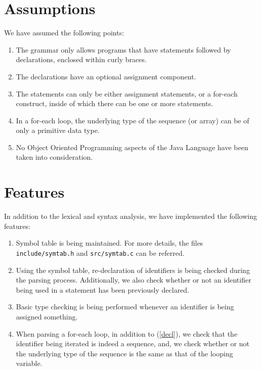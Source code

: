 \documentclass{article}
\begin{document}
\section{Assumptions}

We have assumed the following points:

\begin{enumerate}
    \item The grammar only allows programs that have statements followed by declarations, enclosed within curly braces.
    \item The declarations have an optional assignment component.
    \item The statements can only be either assignment statements, or a for-each construct, inside of which there can be one or more statements.
    \item In a for-each loop, the underlying type of the sequence (or array) can be of only a primitive data type.
    \item No Object Oriented Programming aspects of the Java Language have been taken into consideration.
\end{enumerate}

\section{Features}

In addition to the lexical and syntax analysis, we have implemented the following features:

\begin{enumerate}
    \item Symbol table is being maintained. For more details, the files \\ \texttt{include/symtab.h} and \texttt{src/symtab.c} can be referred.
    \item \label{decl} Using the symbol table, re-declaration of identifiers is being checked during the parsing process. Additionally, we also check whether or not an identifier being used in a statement has been previously declared.
    \item Basic type checking is being performed whenever an identifier is being assigned something.
    \item When parsing a for-each loop, in addition to (\ref{decl}), we check that the identifier being iterated is indeed a sequence, and, we check whether or not the underlying type of the sequence is the same as that of the looping variable.
\end{enumerate}
\end{document}
